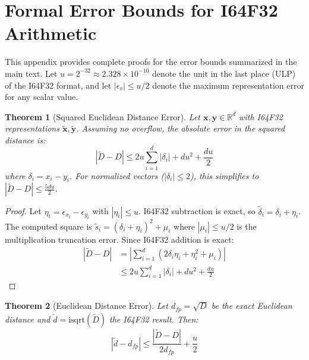 \documentclass[10pt,journal]{IEEEtran}
\newtheorem{theorem}{Theorem}
\begin{document}
\appendices
\section{Formal Error Bounds for I64F32 Arithmetic}
\label{sec:appendix_proofs}

This appendix provides complete proofs for the error bounds summarized in the main text. Let $u = 2^{-32} \approx 2.328 \times 10^{-10}$ denote the unit in the last place (ULP) of the I64F32 format, and let $|\epsilon_v| \leq u/2$ denote the maximum representation error for any scalar value.

\begin{theorem}[Squared Euclidean Distance Error]
\label{thm:sq_dist_error}
Let $\mathbf{x}, \mathbf{y} \in \mathbb{R}^d$ with I64F32 representations $\tilde{\mathbf{x}}, \tilde{\mathbf{y}}$. Assuming no overflow, the absolute error in the squared distance is:
\begin{equation}
  |\tilde{D} - D| \leq 2u\sum_{i=1}^{d}|\delta_i| + du^2 + \frac{du}{2}
\end{equation}
where $\delta_i = x_i - y_i$. For normalized vectors ($|\delta_i| \leq 2$), this simplifies to $|\tilde{D} - D| \leq \frac{5du}{2}$.
\end{theorem}

\begin{proof}
Let $\eta_i = \epsilon_{x_i} - \epsilon_{y_i}$ with $|\eta_i| \leq u$. I64F32 subtraction is exact, so $\tilde{\delta}_i = \delta_i + \eta_i$. The computed square is $\tilde{s}_i = (\delta_i + \eta_i)^2 + \mu_i$ where $|\mu_i| \leq u/2$ is the multiplication truncation error. Since I64F32 addition is exact:
\begin{align}
  |\tilde{D} - D| &= \left|\sum_{i=1}^{d}(2\delta_i\eta_i + \eta_i^2 + \mu_i)\right| \\
  &\leq 2u\sum_{i=1}^{d}|\delta_i| + du^2 + \frac{du}{2}
\end{align}
\end{proof}

\begin{theorem}[Euclidean Distance Error]
\label{thm:eucl_dist_error}
Let $d_{fp} = \sqrt{D}$ be the exact Euclidean distance and $\tilde{d} = \mathrm{isqrt}(\tilde{D})$ the I64F32 result. Then:
\begin{equation}
  |\tilde{d} - d_{fp}| \leq \frac{|\tilde{D} - D|}{2d_{fp}} + \frac{u}{2}
\end{equation}
\end{theorem}
\end{document}
